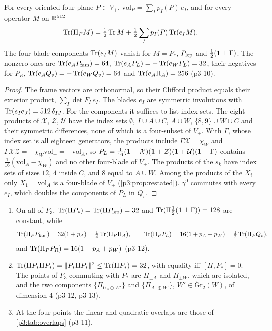 \begin{lemma}
\label{p3:lem:plucker}
For every oriented four-plane $P\subset V_+$, $\mathrm{vol}_P=\sum_Ip_I(P)\,e_I$, and for every operator $M$ on $\mathbb{R}^{512}$
\[
\operatorname{Tr}(\Pi_PM)=\tfrac12\operatorname{Tr} M+\tfrac12\sum_Ip_I(P)\operatorname{Tr}(e_IM).
\]
The four-blade components $\operatorname{Tr}(e_IM)$ vanish for $M=P_*$, $P_{\rm lep}$ and $\tfrac12(\mathbf 1\pm\Gamma)$. The nonzero ones are $\operatorname{Tr}(e_AP_{\rm fam})=64$,
$\operatorname{Tr}(e_AP_L)=-\operatorname{Tr}(e_WP_L)=32$, their negatives for $P_R$, $\operatorname{Tr}(e_AQ_v)=-\operatorname{Tr}(e_WQ_v)=64$ and $\operatorname{Tr}(e_A\Pi_A)=256$ (p3-10).
\end{lemma}

\begin{proof}
The frame vectors are orthonormal, so their Clifford product equals their exterior product, $\sum_I\det F_I\,e_I$. The blades $e_I$ are symmetric involutions with
$\operatorname{Tr}(e_Ie_J)=512\,\delta_{IJ}$. For the components it suffices to list index sets. The eight products of $\mathcal X$, $\mathcal Z$, $\mathcal U$ have the index sets $\emptyset$, $I\cup A\cup C$,
$A\cup W$, $\{8,9\}\cup W\cup C$ and their symmetric differences, none of which is a four-subset of $V_+$. With $\Gamma$, whose index set is all eighteen generators, the
products include $\Gamma\mathcal X=\chi_W$ and $\Gamma\mathcal X\mathcal Z=-\chi_W\mathrm{vol}_+=-\mathrm{vol}_A$, so $P_L=\tfrac1{16}(\mathbf 1+\mathcal X)(\mathbf 1+\mathcal Z)(\mathbf 1+\mathcal U)(\mathbf 1-\Gamma)$ contains
$\tfrac1{16}(\mathrm{vol}_A-\chi_W)$ and no other four-blade of $V_+$. The products of the $s_k$ have index sets of sizes $12$, $4$ inside $C$, and $8$ equal to $A\cup W$.
Among the products of the $X_i$ only $X_1=\mathrm{vol}_A$ is a four-blade of $V_+$ (\cref{p3:prop:restated}). $\gamma^0$ commutes with every $e_I$, which doubles the components
of $P_L$ in $Q_v$.
\end{proof}

\begin{proposition}
\label{p3:prop:overlaps}
\begin{enumerate}[label=(\roman*),leftmargin=2.2em]
\item On all of $F_3$, $\operatorname{Tr}(\Pi P_*)=\operatorname{Tr}(\Pi P_{\rm lep})=32$ and $\operatorname{Tr}(\Pi\tfrac12(\mathbf 1\pm\Gamma))=128$ are constant, while
\[
\operatorname{Tr}(\Pi_PP_{\rm fam})=32(1+p_A)=\tfrac14\operatorname{Tr}(\Pi_P\Pi_A),\qquad \operatorname{Tr}(\Pi_PP_L)=16(1+p_A-p_W)=\tfrac12\operatorname{Tr}(\Pi_PQ_v),
\]
and $\operatorname{Tr}(\Pi_PP_R)=16(1-p_A+p_W)$ (p3-12).
\item $\operatorname{Tr}(\Pi P_*\Pi P_*)=\|P_*\Pi P_*\|^2\le\operatorname{Tr}(\Pi P_*)=32$, with equality iff $[\Pi,P_*]=0$. The points of $F_3$ commuting with $P_*$ are $\Pi_{\pm A}$ and $\Pi_{\pm W}$,
which are isolated, and the two components $\{\Pi_{U_A\oplus W'}\}$ and $\{\Pi_{A_0\oplus W'}\}$, $W'\in\widetilde{\mathrm{Gr}}_2(W)$, of dimension $4$ (p3-12, p3-13).
\item At the four points the linear and quadratic overlaps are those of \cref{p3:tab:overlaps} (p3-11).
\end{enumerate}
\end{proposition}

